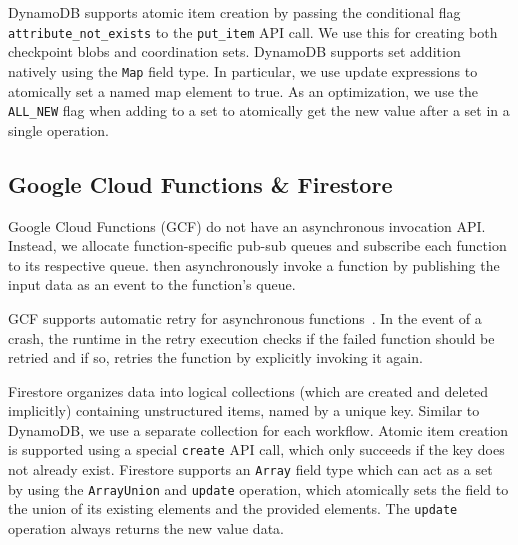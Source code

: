 DynamoDB supports atomic item creation by passing the conditional flag
\texttt{attribute\_not\_exists} to the \texttt{put\_item} API call. We use
this for creating both checkpoint blobs and coordination sets. DynamoDB
supports set addition natively using the \texttt{Map} field type. In
particular, we use update expressions to atomically set a named map element to
true.  As an optimization, we use the \texttt{ALL\_NEW} flag when adding to a
set to atomically get the new value after a set in a single operation.

\subsection{Google Cloud Functions \& Firestore}

Google Cloud Functions (GCF) do not have an asynchronous invocation API.
Instead, we allocate function-specific pub-sub queues and subscribe each
function to its respective queue.  \name{} then asynchronously invoke a
function by publishing the input data as an event to the function's queue.

GCF supports automatic retry for asynchronous
functions~\cite{google-cloud-functions-retry}. In the event of a crash, the
\name{} runtime in the retry execution checks if the failed function should be
retried and if so, retries the function by explicitly invoking it again.

Firestore organizes data into logical collections (which are created and
deleted implicitly) containing unstructured items, named by a unique key.
Similar to DynamoDB, we use a separate collection for each workflow. Atomic
item creation is supported using a special \texttt{create} API call, which
only succeeds if the key does not already exist. Firestore supports an
\texttt{Array} field type which can act as a set by using the
\texttt{ArrayUnion} and \texttt{update} operation, which atomically sets the
field to the union of its existing elements and the provided elements. The
\texttt{update} operation always returns the new value data.
